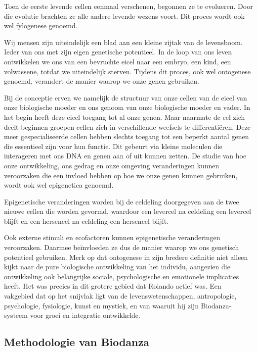 \documentclass[
  11pt,
]{book}
\begin{document}
Toen de eerste levende cellen eenmaal verschenen, begonnen ze te evolueren. Door die evolutie brachten ze alle andere levende wezens voort. Dit proces wordt ook wel fylogenese genoemd.

Wij mensen zijn uiteindelijk een blad aan een kleine zijtak van de levensboom. Ieder van ons met zijn eigen genetische potentieel. In de loop van ons leven ontwikkelen we ons van een bevruchte eicel naar een embryo, een kind, een volwassene, totdat we uiteindelijk sterven. Tijdens dit proces, ook wel ontogenese genoemd, verandert de manier waarop we onze genen gebruiken.

Bij de conceptie erven we namelijk de structuur van onze cellen van de eicel van onze biologische moeder en ons genoom van onze biologische moeder en vader. In het begin heeft deze eicel toegang tot al onze genen. Maar naarmate de cel zich deelt beginnen groepen cellen zich in verschillende weefsels te differentiëren. Deze meer gespecialiseerde cellen hebben slechts toegang tot een beperkt aantal genen die essentieel zijn voor hun functie. Dit gebeurt via kleine moleculen die interageren met ons DNA en genen aan of uit kunnen zetten. De studie van hoe onze ontwikkeling, ons gedrag en onze omgeving veranderingen kunnen veroorzaken die een invloed hebben op hoe we onze genen kunnen gebruiken, wordt ook wel epigenetica genoemd.

Epigenetische veranderingen worden bij de celdeling doorgegeven aan de twee nieuwe cellen die worden gevormd, waardoor een levercel na celdeling een levercel blijft en een hersencel na celdeling een hersencel blijft.

Ook externe stimuli en ecofactoren kunnen epigenetische veranderingen veroorzaken.
Daarmee beïnvloeden ze dus de manier waarop we ons genetisch potentieel gebruiken.
Merk op dat ontogenese in zijn bredere definitie niet alleen kijkt naar de pure biologische ontwikkeling van het individu, aangezien die ontwikkeling ook belangrijke sociale, psychologische en emotionele implicaties heeft. Het was precies in dit grotere gebied dat Rolando actief was. Een vakgebied dat op het snijvlak ligt van de levenswetenschappen, antropologie, psychologie, fysiologie, kunst en mystiek, en van waaruit hij zijn Biodanza-systeem voor groei en integratie ontwikkelde.

\hypertarget{methodologie-van-biodanza}{%
\subsection{Methodologie van Biodanza}\label{methodologie-van-biodanza}}
\end{document}
